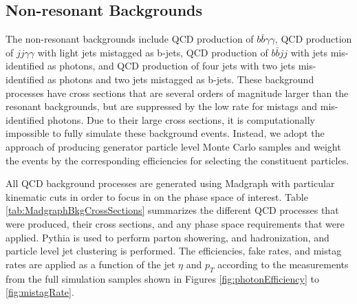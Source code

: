 \documentclass{cmspaper}
\begin{document}



\subsection{Non-resonant Backgrounds}
The non-resonant backgrounds include QCD production of $b \bar{b} \gamma\gamma$, QCD production
of $jj \gamma\gamma$ with light jets mistagged as b-jets, QCD production of $b \bar{b} jj$ with
jets mis-identified as photons, and QCD production of four jets with two jets mis-identified 
as photons and two jets mistagged as b-jets. These background processes have cross sections
that are several orders of magnitude larger than the resonant backgrounds, but are suppressed
by the low rate for mistags and mis-identified photons. Due to their large cross sections, 
it is computationally impossible to fully simulate these background events. Instead, we adopt the
approach of producing generator particle level Monte Carlo samples and weight the events by the
corresponding efficiencies for selecting the constituent particles.

All QCD background processes are generated using Madgraph \cite{madgraph} with particular kinematic
cuts in order to focus in on the phase space of interest. Table \ref{tab:MadgraphBkgCrossSections} 
summarizes the different QCD processes that were produced, their cross sections, 
and any phase space requirements that were applied. Pythia is used to perform parton showering,
and hadronization, and particle level jet clustering is performed. The efficiencies, fake rates, and
mistag rates are applied as a function of the jet $\eta$ and $p_{T}$ according to the measurements
from the full simulation samples shown in Figures \ref{fig:photonEfficiency} to \ref{fig:mistagRate}.
\end{document}
